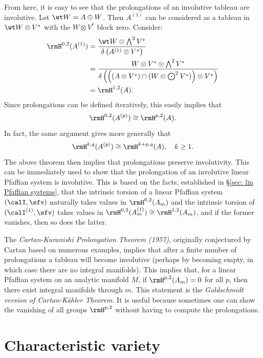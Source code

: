 From here, it is easy to see that the prolongations of an involutive tableau are involutive. Let $\wt W=A\oplus W$. Then $A^{(1)}$ can be considered as a tableau in $\wt W\otimes V^\ast$ with the $W\otimes V^\ast$ block zero. Consider:
\begin{align}
    \rmH^{0,2}(A^{(1)})&= \frac{\wt W\otimes \bigwedge^2 V^\ast}{\delta\left(A^{(1)}\otimes V^\ast\right)}\\
    &= \frac{W\otimes V^\ast\otimes \bigwedge^2 V^\ast}{\delta\left(\left((A\otimes V^\ast)\cap (W\otimes \bigodot^2 V^\ast)\right)\otimes V^\ast\right)}\\
    &=\rmH^{1,2}(A).
\end{align}
Since prolongations can be defined iteratively, this easily implies that 
\[\rmH^{0,2}(A^{(p)})\cong \rmH^{p,2}(A).\]
In fact, the same argument gives more generally that 
\[\rmH^{k,q}(A^{(p)})\cong \rmH^{k+p,q}(A),\quad k\geq 1.\]
The above theorem then implies that prolongations preserve involutivity. This can be immediately used to show that the prolongation of an involutive linear Pfaffian system is involutive. This is based on the facts, established in \S\ref{sec: lin Pfaffian systems}, that the intrinsic torsion of a linear Pfaffian system  $(\calI,\sfv)$ naturally takes values in $\rmH^{0,2}(A_m)$ and the intrinsic torsion of $(\calI^{(1)},\sfv)$ takes values in $\rmH^{0,2}(A_m^{(1)})\cong \rmH^{1,2}(A_m)$, and if the former vanishes, then so does the latter.

\begin{rem}
    The \emph{Cartan-Kuranishi Prolongation Theorem (1957)}, originally conjectured by Cartan based on numerous examples, implies that after a finite number of prolongations a tableau will become involutive (perhaps by becoming empty, in which case there are no integral manifolds). This implies that, for a linear Pfaffian system on an analytic manifold $M$, if $\rmH^{p,2}(A_m)=0$ for all $p$, then there exist integral manifolds through $m$. This statement is the \emph{Goldschmidt version of Cartan-K\"ahler Theorem}. It is useful because sometimes one can show the vanishing of all groups $\rmH^{p,2}$ without having to compute the prolongations.
\end{rem}







\section{Characteristic variety}




